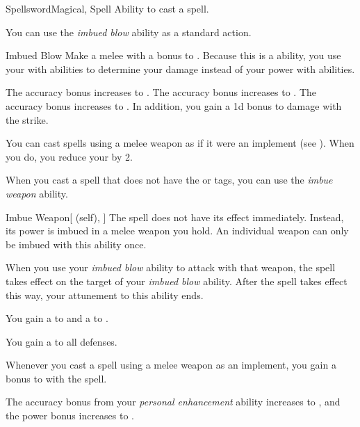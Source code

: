     \begin{feat}{Spellsword}{Magical, Spell}
        \featpre Ability to cast a spell.

         You can use the \textit{imbued blow} ability as a standard action.
        \begin{freeability}{Imbued Blow}
            Make a melee  with a  bonus to .
            Because this is a  ability, you use your  with  abilities to determine your damage instead of your power with  abilities.

            \rankline
             The accuracy bonus increases to .
             The accuracy bonus increases to .
             The accuracy bonus increases to .
                In addition, you gain a \plus1d bonus to damage with the strike.
        \end{freeability}

         You can cast spells using a melee weapon as if it were an implement (see ).
        When you do, you reduce your  by 2.

         When you cast a spell that does not have the  or  tags,
            you can use the \textit{imbue weapon} ability.
        \begin{attuneability}{Imbue Weapon}[ (self), ]
            The spell does not have its effect immediately.
            Instead, its power is imbued in a melee weapon you hold.
            An individual weapon can only be imbued with this ability once.

            When you use your \textit{imbued blow} ability to attack with that weapon, the spell takes effect on the target of your \textit{imbued blow} ability.
            After the spell takes effect this way, your attunement to this ability ends.
        \end{attuneability}

         You gain a   to  and a   to .

         You gain a   to all defenses.

         Whenever you cast a spell using a melee weapon as an implement, you gain a  bonus to  with the spell.

         The accuracy bonus from your \textit{personal enhancement} ability increases to , and the power bonus increases to .
    \end{feat}

